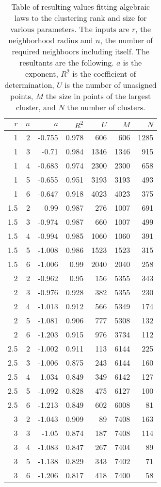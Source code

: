 \documentclass{article}
\begin{document}
\begin{table}[h]
\begin{center}
  \begin{tabular}{|r|r||r|r|r|r|r|}
 $r$ &  $n$  & $a$ & $ R^2$ & $U$ & $M$ & $N$  \\ \hline 
  1 &  2 & -0.755 &  0.978 & 606 & 606 & 1285 \\
  1 &  3 & -0.71 &  0.984 & 1346 & 1346 & 915 \\
  1 &  4 & -0.683 &  0.974 & 2300 & 2300 & 658 \\
  1 &  5 & -0.655 &  0.951 & 3193 & 3193 & 493 \\
  1 &  6 & -0.647 &  0.918 & 4023 & 4023 & 375 \\
  1.5 &  2 & -0.99 &  0.987 & 276 & 1007 & 691 \\
  1.5 &  3 & -0.974 &  0.987 & 660 & 1007 & 499 \\
  1.5 &  4 & -0.994 &  0.985 & 1060 & 1060 & 391 \\
  1.5 &  5 & -1.008 &  0.986 & 1523 & 1523 & 315 \\
  1.5 &  6 & -1.006 &  0.99 & 2040 & 2040 & 258 \\
  2 &  2 & -0.962 &  0.95 & 156 & 5355 & 343 \\
  2 &  3 & -0.976 &  0.928 & 382 & 5355 & 230 \\
  2 &  4 & -1.013 &  0.912 & 566 & 5349 & 174 \\
  2 &  5 & -1.081 &  0.906 & 777 & 5308 & 132 \\
  2 &  6 & -1.203 &  0.915 & 976 & 3734 & 112 \\
  2.5 &  2 & -1.002 &  0.911 & 113 & 6144 & 225 \\
  2.5 &  3 & -1.006 &  0.875 & 243 & 6144 & 160 \\
  2.5 &  4 & -1.034 &  0.849 & 349 & 6142 & 127 \\
  2.5 &  5 & -1.092 &  0.828 & 475 & 6127 & 100 \\
  2.5 &  6 & -1.213 &  0.849 & 602 & 6008 & 81 \\
  3 &  2 & -1.043 &  0.909 & 89 & 7408 & 163 \\
  3 &  3 & -1.05 &  0.874 & 187 & 7408 & 114 \\
  3 &  4 & -1.083 &  0.847 & 267 & 7404 & 89 \\
  3 &  5 & -1.138 &  0.829 & 343 & 7402 & 71 \\
  3 &  6 & -1.206 &  0.817 & 418 & 7400 & 58 \\
\end{tabular}
\caption{Table of resulting values fitting algebraic laws to the clustering
  rank and size for various parameters. The inputs are $r$, the neighborhood 
  radius and $n$, the number of required neighboors including itself.
  The resultants are the following.
  $a$ is the exponent,
  $R^2$ is the coefficient of determination, 
  $U$ is the number of
  unasigned points, $M$ the size in points of the largest
  cluster, and $N$ the number of clusters. }
\label{tablarquad}
\end{center}
\end{table}

%




\end{document}
